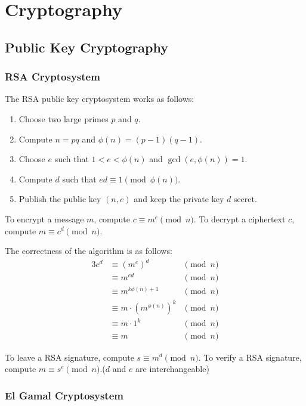 \documentclass[a4paper,12pt]{article}
\begin{document}
\section{Cryptography}

\subsection{Public Key Cryptography}

\subsubsection{RSA Cryptosystem}

The RSA public key cryptosystem works as follows:
\begin{enumerate}
	\item Choose two large primes $p$ and $q$.
	\item Compute $n = pq$ and $\phi(n) = (p-1)(q-1)$.
	\item Choose $e$ such that $1 < e < \phi(n)$ and $\gcd(e, \phi(n)) = 1$.
	\item Compute $d$ such that $ed \equiv 1 \pmod{\phi(n)}$.
	\item Publish the public key $(n,e)$ and keep the private key $d$ secret.
\end{enumerate}

To encrypt a message $m$, compute $c \equiv m^e \pmod{n}$.
To decrypt a ciphertext $c$, compute $m \equiv c^d \pmod{n}$.

The correctness of the algorithm is as follows:
\begin{alignat*}{3}
	c^d &\equiv (m^e)^d &\pmod{n} \\
	&\equiv m^{ed} &\pmod{n} \\
	&\equiv m^{k \phi(n) + 1} &\pmod{n} \\
	&\equiv m \cdot (m^{\phi(n)})^k &\pmod{n} \\
	&\equiv m \cdot 1^k &\pmod{n} \\
	&\equiv m &\pmod{n}
\end{alignat*}

To leave a RSA signature, compute $s \equiv m^d \pmod{n}$.
To verify a RSA signature, compute $m \equiv s^e \pmod{n}$.($d$ and $e$ are interchangeable)

\subsubsection{El Gamal Cryptosystem}
\end{document}
